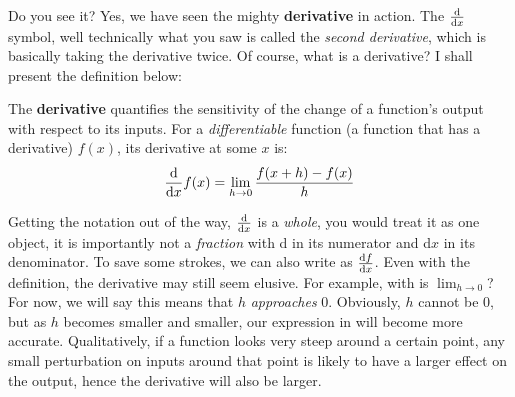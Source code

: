 Do you see it? Yes, we have seen the mighty \textbf{derivative} in action. The \(\odv{}{x}\) symbol, well technically what you saw is called the \emph{second derivative}, which is basically taking the derivative twice. Of course, what is a derivative? I shall present the definition below:
\begin{definition}
  The \textbf{derivative} quantifies the sensitivity of the change of a function's output with respect to its inputs. For a \emph{differentiable} function (a function that has a derivative) \(f(x)\), its derivative at some \(x\) is:
  \begin{equation}
    \odv{}{x}f(x) = \lim_{h\to 0}\frac{f(x+h)-f(x)}{h} \label{derivative}
  \end{equation}
\end{definition}


Getting the notation out of the way, \(\odv{}{x}\) is a \emph{whole}, you would treat it as one object, it is importantly not a \emph{fraction} with d in its numerator and d\(x\) in its denominator. To save some strokes, we can also write  as \(\odv{f}{x}\). Even with the definition, the derivative may still seem elusive. For example, with is \(\lim_{h\to 0}\)? For now, we will say this means that \(h\) \emph{approaches} 0. Obviously, \(h\) cannot be 0, but as \(h\) becomes smaller and smaller, our expression in  will become more accurate. Qualitatively, if a function looks very steep around a certain point, any small perturbation on inputs around that point is likely to have a larger effect on the output, hence the derivative will also be larger. 
